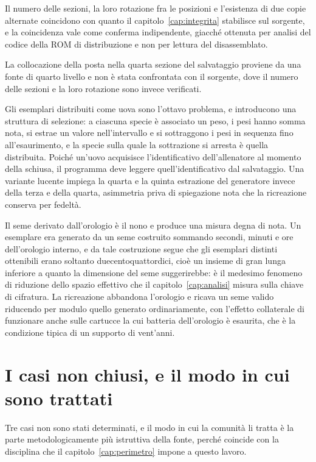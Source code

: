 Il numero delle sezioni, la loro rotazione fra le posizioni e l'esistenza di due copie alternate coincidono con quanto il capitolo~\ref{cap:integrita} stabilisce sul sorgente, e la coincidenza vale come conferma indipendente, giacché ottenuta per analisi del codice della ROM di distribuzione e non per lettura del disassemblato.

\begin{daverificare}
La collocazione della posta nella quarta sezione del salvataggio proviene da una fonte di quarto livello e non è stata confrontata con il sorgente, dove il numero delle sezioni e la loro rotazione sono invece verificati.
\end{daverificare}

Gli esemplari distribuiti come uova sono l'ottavo problema, e introducono una struttura di selezione: a ciascuna specie è associato un peso, i pesi hanno somma nota, si estrae un valore nell'intervallo e si sottraggono i pesi in sequenza fino all'esaurimento, e la specie sulla quale la sottrazione si arresta è quella distribuita. Poiché un'uovo acquisisce l'identificativo dell'allenatore al momento della schiusa, il programma deve leggere quell'identificativo dal salvataggio. Una variante lucente impiega la quarta e la quinta estrazione del generatore invece della terza e della quarta, asimmetria priva di spiegazione nota che la ricreazione conserva per fedeltà.

Il seme derivato dall'orologio è il nono e produce una misura degna di nota. Un esemplare era generato da un seme costruito sommando secondi, minuti e ore dell'orologio interno, e da tale costruzione segue che gli esemplari distinti ottenibili erano soltanto duecentoquattordici, cioè un insieme di gran lunga inferiore a quanto la dimensione del seme suggerirebbe: è il medesimo fenomeno di riduzione dello spazio effettivo che il capitolo~\ref{cap:analisi} misura sulla chiave di cifratura. La ricreazione abbandona l'orologio e ricava un seme valido riducendo per modulo quello generato ordinariamente, con l'effetto collaterale di funzionare anche sulle cartucce la cui batteria dell'orologio è esaurita, che è la condizione tipica di un supporto di vent'anni.

\section{I casi non chiusi, e il modo in cui sono trattati}

Tre casi non sono stati determinati, e il modo in cui la comunità li tratta è la parte metodologicamente più istruttiva della fonte, perché coincide con la disciplina che il capitolo~\ref{cap:perimetro} impone a questo lavoro.

